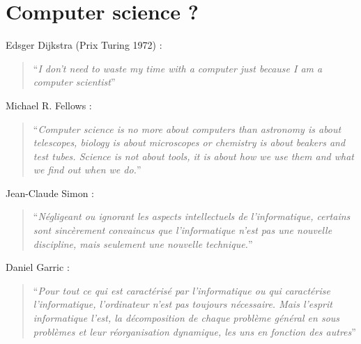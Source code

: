 \documentclass[french]{beamer}
\begin{document}
\section{Computer science ?}

\begin{frame}

Edsger Dijkstra (Prix Turing 1972) :

\begin{quote}
``\emph{I don't need to waste my time with a computer just because I am
a computer scientist}''
\end{quote}

\end{frame}

\begin{frame}

Michael R. Fellows :

\begin{quote}
``\emph{Computer science is no more about computers than astronomy is
about telescopes, biology is about microscopes or chemistry is about
beakers and test tubes. Science is not about tools, it is about how we
use them and what we find out when we do.}''
\end{quote}
\end{frame}

\begin{frame}

Jean-Claude Simon :

\begin{quote}
``\emph{Négligeant ou ignorant les aspects intellectuels de
l'informatique, certains sont sincèrement convaincus que l'informatique
n'est pas une nouvelle discipline, mais seulement une nouvelle
technique.}''
\end{quote}

\end{frame}


\begin{frame}
Daniel Garric :

\begin{quote}
``\emph{Pour tout ce qui est caractérisé par l'informatique ou qui
caractérise l'informatique, l'ordinateur n'est pas toujours nécessaire.
Mais l'esprit informatique l'est, la décomposition de chaque problème
général en sous problèmes et leur réorganisation dynamique, les uns en
fonction des autres}''
\end{quote}

\end{frame}
\end{document}
